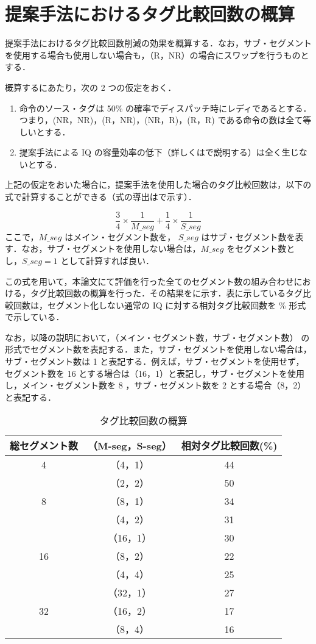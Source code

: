 \section{提案手法におけるタグ比較回数の概算}
\label{sec:comp_estimate}
提案手法におけるタグ比較回数削減の効果を概算する．なお，サブ・セグメントを使用する場合も使用しない場合も，（R，NR）の場合にスワップを行うものとする．

概算するにあたり，次の 2 つの仮定をおく．
\begin{enumerate}
  \item 命令のソース・タグは 50\% の確率でディスパッチ時にレディであるとする．つまり，(NR，NR)，(R，NR)，(NR，R)，(R，R) である命令の数は全て等しいとする．
  \item 提案手法による IQ の容量効率の低下（詳しくはで説明する）は全く生じないとする．
\end{enumerate}
上記の仮定をおいた場合に，提案手法を使用した場合のタグ比較回数は，以下の式で計算することができる（式の導出はで示す）．

\[
  \frac{3}{4}\times\frac{1}{M\_seg} + \frac{1}{4}\times\frac{1}{S\_seg}
\]
ここで，$M\_seg$ はメイン・セグメント数を， $S\_seg$ はサブ・セグメント数を表す．なお，サブ・セグメントを使用しない場合は，$M\_seg$ をセグメント数とし，$S\_seg = 1 $ として計算すれば良い．

この式を用いて，本論文にて評価を行った全てのセグメント数の組み合わせにおける，タグ比較回数の概算を行った．その結果をに示す．表に示しているタグ比較回数は，セグメント化しない通常の IQ に対する相対タグ比較回数を \% 形式で示している．

なお，以降の説明において，（メイン・セグメント数，サブ・セグメント数） の形式でセグメント数を表記する．また，サブ・セグメントを使用しない場合は，サブ・セグメント数は 1 と表記する．例えば，サブ・セグメントを使用せず，セグメント数を 16 とする場合は（16，1）と表記し，サブ・セグメントを使用し，メイン・セグメント数を 8 ，サブ・セグメント数を 2 とする場合（8，2）と表記する．

\begin{table}[htb]
  \caption{タグ比較回数の概算}
  \footnotesize
  \center
    \begin{tabular}{c|c|c} \hline \hline
    総セグメント数 & （M-seg，S-seg） & 相対タグ比較回数(\%) \\ \hline
    4 &（4，1） & 44 \\
    &（2，2） & 50 \\ \hline
    8 &（8，1） & 34 \\
    &（4，2） & 31 \\ \hline
    &（16，1） & 30 \\
    16 &（8，2） & 22 \\
    &（4，4） & 25 \\ \hline
    &（32，1） & 27 \\
    32 &（16，2） & 17 \\
    &（8，4） & 16 \\ \hline
  \end{tabular}
  \label{tab:comp_estimate}
\end{table}

